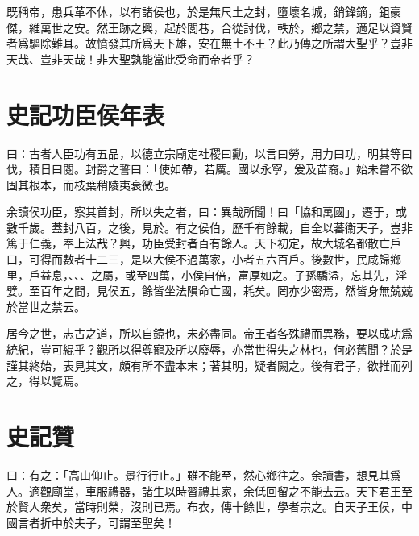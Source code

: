 既稱帝，患兵革不休，以有諸侯也，於是無尺土之封，墮壞名城，銷鋒鏑，鉏豪傑，維萬世之安。然王跡之興，起於閭巷，合從討伐，軼於，鄉之禁，適足以資賢者爲驅除難耳。故憤發其所爲天下雄，安在無土不王？此乃傳之所謂大聖乎？豈非天哉、豈非天哉！非大聖孰能當此受命而帝者乎？

\section[高祖功臣侯年表\quad{\small 史記}]{{\normalsize 史記}\quad{}功臣侯年表}
曰：古者人臣功有五品，以德立宗廟定社稷曰勳，以言曰勞，用力曰功，明其等曰伐，積日曰閱。封爵之誓曰：「使如帶，若厲。國以永寧，爰及苗裔。」始未嘗不欲固其根本，而枝葉稍陵夷衰微也。

余讀侯功臣，察其首封，所以失之者，曰：異哉所聞！曰「協和萬國」，遷于，或數千歲。蓋封八百，之後，見於。有之侯伯，歷千有餘載，自全以蕃衞天子，豈非篤于仁義，奉上法哉？興，功臣受封者百有餘人。天下初定，故大城名都散亡戶口，可得而數者十二三，是以大侯不過萬家，小者五六百戶。後數世，民咸歸鄉里，戶益息，、、、之屬，或至四萬，小侯自倍，富厚如之。子孫驕溢，忘其先，淫嬖。至百年之間，見侯五，餘皆坐法隕命亡國，耗矣。罔亦少密焉，然皆身無兢兢於當世之禁云。

居今之世，志古之道，所以自鏡也，未必盡同。帝王者各殊禮而異務，要以成功爲統紀，豈可緄乎？觀所以得尊寵及所以廢辱，亦當世得失之林也，何必舊聞？於是謹其終始，表見其文，頗有所不盡本末；著其明，疑者闕之。後有君子，欲推而列之，得以覽焉。

\section[孔子世家贊\quad{\small 史記}]{{\normalsize 史記}\quad{}贊}
曰：有之：「高山仰止。景行行止。」雖不能至，然心鄉往之。余讀書，想見其爲人。適觀廟堂，車服禮器，諸生以時習禮其家，余低回留之不能去云。天下君王至於賢人衆矣，當時則榮，沒則已焉。布衣，傳十餘世，學者宗之。自天子王侯，中國言者折中於夫子，可謂至聖矣！

